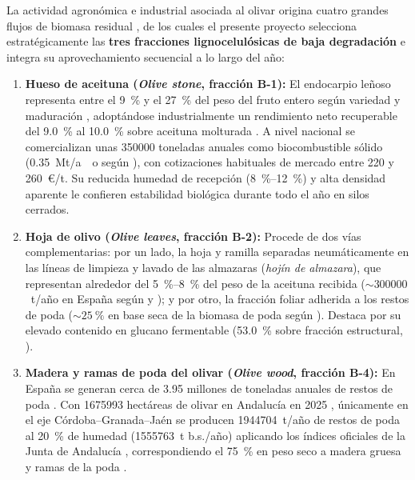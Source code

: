 \documentclass{report}
\begin{document}
La actividad agronómica e industrial asociada al olivar origina cuatro grandes flujos de biomasa residual \autocite{RomeroGarcia2014, Manzanares2017, MoranAlarcon2026}, de los cuales el presente proyecto selecciona estratégicamente las \textbf{tres fracciones lignocelulósicas de baja degradación} e integra su aprovechamiento secuencial a lo largo del año:
\begin{enumerate}
    \item \textbf{Hueso de aceituna (\textit{Olive stone}, fracción B-1):} El endocarpio leñoso representa entre el \SI{9}{\percent} y el \SI{27}{\percent} del peso del fruto entero según variedad y maduración \autocite[Secciones~1--2]{ElFessikh2025}, adoptándose industrialmente un rendimiento neto recuperable del \SI{9.0}{\percent} al \SI{10.0}{\percent} sobre aceituna molturada \autocite{RomeroGarcia2016, Padilla-Rascon2022}. A nivel nacional se comercializan unas \num{350000} toneladas anuales como biocombustible sólido (\SI{0.35}{Mt/ao} según \textcite[Sección~3.1]{MoranAlarcon2026}), con cotizaciones habituales de mercado entre \num{220} y \num{260}~€/t. Su reducida humedad de recepción (\SI{8}{\percent}--\SI{12}{\percent}) y alta densidad aparente le confieren estabilidad biológica durante todo el año en silos cerrados.
    \item \textbf{Hoja de olivo (\textit{Olive leaves}, fracción B-2):} Procede de dos vías complementarias: por un lado, la hoja y ramilla separadas neumáticamente en las líneas de limpieza y lavado de las almazaras (\textit{hojín de almazara}), que representan alrededor del \SI{5}{\percent}--\SI{8}{\percent} del peso de la aceituna recibida ($\sim \num{300000}$~t/año en España según \textcite[Sección~3.1]{MoranAlarcon2026} y \textcite{RomeroGarcia2014}); y por otro, la fracción foliar adherida a los restos de poda ($\sim \SI{25}{\percent}$ en base seca de la biomasa de poda según \textcite{RomeroGarcia2014}). Destaca por su elevado contenido en glucano fermentable (\SI{53.0}{\percent} sobre fracción estructural, \textcite[Tabla~2]{Jafari-Gohargan2026}).
    \item \textbf{Madera y ramas de poda del olivar (\textit{Olive wood}, fracción B-4):} En España se generan cerca de \num{3.95} millones de toneladas anuales de restos de poda \autocite[Sección~3.1]{MoranAlarcon2026}. Con \num{1675993} hectáreas de olivar en Andalucía en 2025 \autocite[Hoja~\texttt{TABLA PROVINCIAL CULTIVOS}, código \texttt{OL1000}]{MAPA2025}, únicamente en el eje Córdoba--Granada--Jaén se producen \num{1944704}~t/año de restos de poda al \SI{20}{\percent} de humedad (\num{1555763}~t b.s./año) aplicando los índices oficiales de la Junta de Andalucía \autocite[Sección~3.1.2, Tabla~3]{CAP2008}, correspondiendo el \SI{75}{\percent} en peso seco a madera gruesa y ramas de la poda \autocite{RomeroGarcia2014}.

\end{enumerate}
\end{document}
